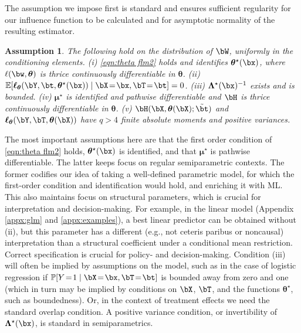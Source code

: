 \documentclass[12pt]{article}
\newtheorem{assumption}{Assumption}
\numberwithin{equation}{section}
\theoremstyle{definition}
\newcommand{\E}{\mathbb{E}}
\renewcommand{\P}{\mathbb{P}}
\newcommand{\bmu}{\boldsymbol{\mu}}
\newcommand{\btheta}{\boldsymbol{\theta}}
\newcommand{\bL}{\boldsymbol{\Lambda}}
\newcommand{\bmtrue}{\bmu^\star}
\newcommand{\bttrue}{\btheta^\star}
\newcommand{\bLtrue}{\bL^\star}
\newcommand{\btstar}{\tilde{\bt}}
\begin{document}
The assumption we impose first is standard and ensures sufficient regularity for our influence function to be calculated and for asymptotic normality of the resulting estimator.
\begin{assumption}
	\label{asmpt:dgp if}
	The following hold on the distribution of $\bW$, uniformly in the conditioning elements. (i) \eqref{eqn:theta flm2} holds and identifies $\bttrue(\bx)$, where $\ell(\bw, \btheta)$ is thrice continuously differentiable in $\btheta$. (ii) $\E[ \bm{\ell}_{\btheta}(\bY, \bt, \bttrue(\bx)) \mid \bX \!=\! \bx, \bT \!=\! \bt ] = 0$. (iii) $\bLtrue(\bx)^{-1}$ exists and is bounded. (iv) $\bmtrue$ is identified and pathwise differentiable and $\bH$ is thrice continuously differentiable in $\btheta$. (v) $\bH(\bX, \btheta(\bX); \btstar)$ and $\bm{\ell}_{\btheta}(\bY,\bT, \btheta(\bX))$ have $q > 4$ finite absolute moments and positive variances. 
\end{assumption}
The most important assumptions here are that the first order condition of \eqref{eqn:theta flm2} holds, $\bttrue(\bx)$ is identified, and that $\bmtrue$ is pathwise differentiable. The latter keeps focus on regular semiparametric contexts. The former codifies our idea of taking a well-defined parametric model, for which the first-order condition and identification would hold, and enriching it with ML. This also maintains focus on structural parameters, which is crucial for interpretation and decision-making. For example, in the linear model (Appendix \ref{appx:glm} and \ref{appx:examples}), a best linear predictor can be obtained without (ii), but this parameter has a different (e.g., not ceteris paribus or noncausal) interpretation than a structural coefficient under a conditional mean restriction. Correct specification is crucial for policy- and decision-making. Condition (iii) will often be implied by assumptions on the model, such as in the case of logistic regression if $\P[Y \!=\! 1 \mid \bX \!=\! \bx, \bT \!=\! \bt]$ is bounded away from zero and one (which in turn may be implied by conditions on $\bX$, $\bT$, and the functions $\bttrue$, such as boundedness). Or, in the context of treatment effects we need the standard overlap condition. A positive variance condition, or invertibility of $\bLtrue(\bx)$, is standard in semiparametrics.
\end{document}
